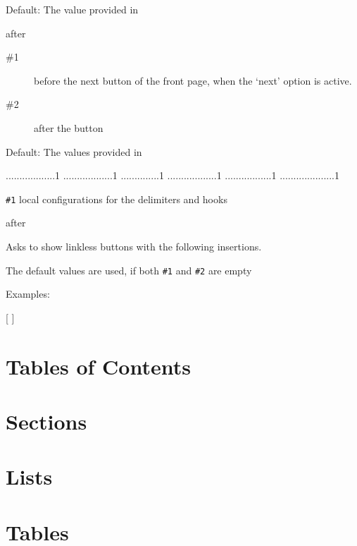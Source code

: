 \documentclass{book}
\begin{document}
Default: The value provided in 

 {after}\EndDoc

\begin{description}
  \item[\#1]  before the next button of the front page, when the `next'
       option is active.
  \item[\#2]  after the button
\end{description}

    Default: The values provided in 

\begin{texsource}
..................1
..................1
..............1
..................1
.................1
....................1
\end{texsource}

  \verb|#1| local configurations for the delimiters and hooks

 {after}\EndDoc

Asks to show linkless buttons with the following insertions.

The default values are used, if both \verb|#1| and \verb|#2| are empty

   Examples:

\begin{texsource}

    {[}
    {] }
\end{texsource}

\section{Tables of Contents}

\section{Sections}
\section{Lists}
\section{Tables}
\end{document}
